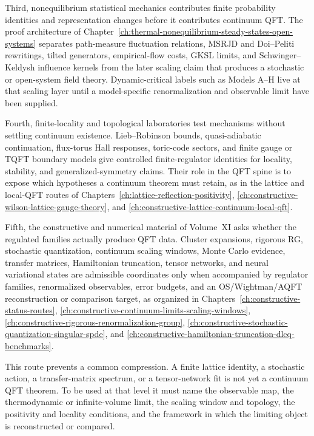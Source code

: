Third, nonequilibrium statistical mechanics contributes finite probability
identities and representation changes before it contributes continuum QFT.
The proof architecture of
Chapter~\ref{ch:thermal-nonequilibrium-steady-states-open-systems} separates
path-measure fluctuation relations, MSRJD and Doi--Peliti rewritings, tilted
generators, empirical-flow costs, GKSL limits, and Schwinger--Keldysh
influence kernels from the later scaling claim that produces a stochastic or
open-system field theory.  Dynamic-critical labels such as Models A--H live
at that scaling layer until a model-specific renormalization and observable
limit have been supplied.

Fourth, finite-locality and topological laboratories test mechanisms without
settling continuum existence.  Lieb--Robinson bounds, quasi-adiabatic
continuation, flux-torus Hall responses, toric-code sectors, and finite gauge
or TQFT boundary models give controlled finite-regulator identities for
locality, stability, and generalized-symmetry claims.  Their role in the QFT
spine is to expose which hypotheses a continuum theorem must retain, as in
the lattice and local-QFT routes of
Chapters~\ref{ch:lattice-reflection-positivity},
\ref{ch:constructive-wilson-lattice-gauge-theory}, and
\ref{ch:constructive-lattice-continuum-local-qft}.

Fifth, the constructive and numerical material of Volume~XI asks whether the
regulated families actually produce QFT data.  Cluster expansions, rigorous
RG, stochastic quantization, continuum scaling windows, Monte Carlo
evidence, transfer matrices, Hamiltonian truncation, tensor networks, and
neural variational states are admissible coordinates only when accompanied
by regulator families, renormalized observables, error budgets, and an
OS/Wightman/AQFT reconstruction or comparison target, as organized in
Chapters~\ref{ch:constructive-status-routes},
\ref{ch:constructive-continuum-limits-scaling-windows},
\ref{ch:constructive-rigorous-renormalization-group},
\ref{ch:constructive-stochastic-quantization-singular-spde}, and
\ref{ch:constructive-hamiltonian-truncation-dlcq-benchmarks}.

This route prevents a common compression.  A finite lattice identity, a
stochastic action, a transfer-matrix spectrum, or a tensor-network fit is not
yet a continuum QFT theorem.  To be used at that level it must name the
observable map, the thermodynamic or infinite-volume limit, the scaling
window and topology, the positivity and locality conditions, and the
framework in which the limiting object is reconstructed or compared.

